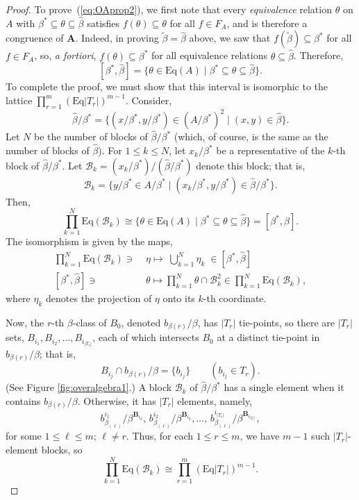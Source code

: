 \documentclass[cm,dissertation]{uhthesis}
\theoremstyle{plain}
\theoremstyle{definition}
\theoremstyle{remark}
\numberwithin{theorem}{section}
\numberwithin{claim}{chapter}
\numberwithin{equation}{section}
\numberwithin{conjecture}{chapter}
\newcommand{\<}{\ensuremath{\langle}}
\renewcommand{\>}{\ensuremath{\rangle}}
\renewcommand{\leq}{\ensuremath{\leqslant}}
\newcommand{\Eq}{\ensuremath{\mathrm{Eq}}}
\newcommand{\0}{\ensuremath{\mathbf{0}}}
\newcommand{\1}{\ensuremath{\mathbf{1}}}
\newcommand{\2}{\ensuremath{\mathbf{2}}}
\newcommand{\3}{\ensuremath{\mathbf{3}}}
\newcommand{\4}{\ensuremath{\mathbf{4}}}
\newcommand{\5}{\ensuremath{\mathbf{5}}}
\newcommand{\bA}{\ensuremath{\mathbf{A}}}
\newcommand{\bB}{\ensuremath{\mathbf{B}}}
\newcommand{\sB}{\ensuremath{\mathscr{B}}}
\newcommand{\tbeta}{\ensuremath{\widetilde{\beta}}}
\begin{document}
\begin{proof}
  To prove~(\ref{eq:OAprop2}),
  we first note that every \emph{equivalence} relation $\theta$ on $A$ with
  $\beta^* \subseteq \theta \subseteq \widehat{\beta}$ satisfies 
  $f(\theta)\subseteq \theta$ for all $f\in F_A$, and is therefore a congruence of
  $\bA$. Indeed, in proving $\tbeta= \widehat{\beta}$ above,
  we saw that $f(\tbeta)\subseteq \beta^*$ for all $f\in F_A$, so,
  {\it a fortiori}, $f(\theta)\subseteq \beta^*$ for all equivalence relations  
  $\theta \subseteq \widehat{\beta}$. 
  Therefore, 
  \[
    [\beta^*, \widehat{\beta}] = 
    \{\theta \in \Eq(A) \mid \beta^* \subseteq \theta \subseteq \widehat{\beta} \}.
    \]
    To complete the proof, we must show that this interval is isomorphic to the lattice 
    $\prod_{r=1}^m (\Eq |T_r|)^{m-1}$.
    Consider,
    \[
    \widehat{\beta}/\beta^* = \{(x/\beta^*, y/\beta^*) \in (A/\beta^*)^2 \mid (x,y) \in \widehat{\beta}\}.
    \]
    Let $N$ be the number of blocks of $\widehat{\beta}/\beta^*$ (which, of course, is the
    same as the number of blocks of $\widehat{\beta}$). For $1\leq k \leq N$, let
    $x_k/\beta^*$ be a representative of the $k$-th block of $\widehat{\beta}/\beta^*$.  Let
    $\sB_k = (x_k/\beta^*)/(\widehat{\beta}/\beta^*)$ denote this block; that is,
    \[
    \sB_k = \{y/\beta^* \in A/\beta^* \mid (x_k/\beta^*, y/\beta^*) \in
    \widehat{\beta}/\beta^*\}.
    \]
    Then,
    \[
    \prod_{k=1}^N \Eq(\sB_k) \cong \{ \theta \in \Eq(A) \mid \beta^* \subseteq \theta
    \subseteq \widehat{\beta} \} = [\beta^*, \widehat{\beta}].
    \]
    The isomorphism is given by the maps,
    \begin{align*}
      \prod_{k=1}^N \Eq(\sB_k) \ni \; & \eta \mapsto \; \bigcup_{k=1}^N \eta_k \; \in [\beta^*, \widehat{\beta}]\\
           [\beta^*, \widehat{\beta}] \ni \;  & \theta \mapsto \prod_{k=1}^N \theta \cap \sB_k^2 \in \prod_{k=1}^N \Eq(\sB_k),
    \end{align*}
    where $\eta_k$ denotes the projection of $\eta$ onto its $k$-th coordinate.

    Now, the $r$-th $\beta$-class of $B_0$, denoted $b_{\beta(r)}/\beta$, has $|T_r|$
    tie-points, so there are $|T_r|$ sets, $B_{i_1}, B_{i_2}, \dots, B_{i_{|T_r|}}$,
    each of which intersects $B_0$ at a distinct tie-point in $b_{\beta(r)}/\beta$;
    that is,
    \[
    B_{i_{j}} \cap b_{\beta(r)}/\beta = \{b_{i_j}\} \qquad (b_{i_j} \in T_r).
    \]
    (See Figure \ref{fig:overalgebra1}.) 
    A block $\sB_k$ of $\widehat{\beta}/\beta^*$ has a single element when it contains 
    $b_{\beta(r)}/\beta$.  Otherwise, it has $|T_r|$ elements, namely,
    \[
    b^{i_1}_{\beta_{(\ell)}}/\beta^{\bB_{i_2}}, \,
    b^{i_2}_{\beta_{(\ell)}}/\beta^{\bB_{i_2}}, \dots, \, b^{i_{|T_r|}}_{\beta_{(\ell)}}/\beta^{\bB_{i_{|T_r|}}},
    \]
    for some $1\leq \ell \leq m; \, \ell \neq r$.  Thus, for each $1\leq r \leq m$, we
    have $m-1$ such $|T_r|$-element blocks, so
    \[
    \prod_{k=1}^N \Eq(\sB_k) \cong 
    \prod_{r=1}^m (\Eq |T_r|)^{m-1}.
    \]

\end{proof}
\end{document}
